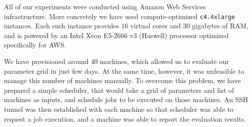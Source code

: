         All of our experiments were conducted using Amazon Web Services infrastructure.
        More concretely we have used compute-optimized \texttt{c4.4xlarge} instances. Each such
        instance provides $16$ virtual cores and $30$ gigabytes of RAM, and is powered
        by an Intel Xeon E5-2666 v3 (Haswell) processor optimized specifically for AWS.

        We have provisioned around $40$ machines, which allowed us to evaluate our parameter grid
        in just few days.
        At the same time, however, it was unfeasible to manage this number of machines manually.
        To overcome this problem, we have prepared a simple scheduler,
        that would take a grid of parameters and list of machines as inputs, and schedule
        jobs to be executed on those machines.
        An SSH tunnel was then established with each machine so that scheduler
        was able to request a job execution, and a machine was able to report the evaluation results.
